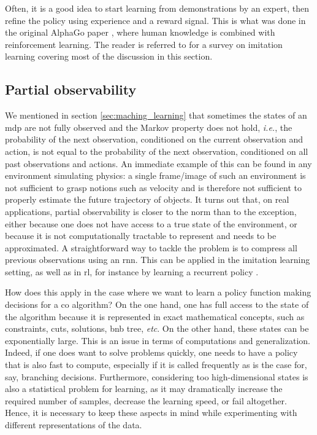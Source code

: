 \documentclass[11pt]{article}
\begin{document}
		Often, it is a good idea to start learning from demonstrations by an expert, then refine the policy
		using experience and a reward signal.
		This is what was done in the original AlphaGo paper \citep{SilverMasteringgameGo2016}, where human
		knowledge is combined with reinforcement learning.
		The reader is referred to \cite{HusseinImitationLearningSurvey2017} for a survey on imitation
		learning covering most of the discussion in this section.

	\subsection{Partial observability}
		\label{sec:partial_observability}
		We mentioned in section \ref{sec:maching_learning} that sometimes the states of an \gls{mdp} are
		not fully observed and the Markov property does not hold, \textit{i.e.}, the probability of the
		next observation, conditioned on the current observation and action, is not equal to the
		probability of the next observation, conditioned on all past observations and actions.
		An immediate example of this can be found in any environment simulating physics: a single
		frame/image of such an environment is not sufficient to grasp notions such as velocity and is
		therefore not sufficient to properly estimate the future trajectory of objects.
		It turns out that, on real applications, partial observability is closer to the norm than to the
		exception, either because one does not have access to a true state of the environment, or because
		it is not computationally tractable to represent and needs to be approximated.
		A straightforward way to tackle the problem is to compress all previous observations using an
		\gls{rnn}.
		This can be applied in the imitation learning setting, as well as in \gls{rl}, for instance by
		learning a recurrent policy \citep{WierstraRecurrentpolicy2010}.

		How does this apply in the case where we want to learn a policy function making decisions for a
		\gls{co} algorithm?
		On the one hand, one has full access to the state of the algorithm because it is represented in
		exact mathematical concepts, such as constraints, cuts, solutions, \gls{bnb} tree, \textit{etc}.
		On the other hand, these states can be exponentially large.
		This is an issue in terms of computations and generalization.
		Indeed, if one does want to solve problems quickly, one needs to have a policy that is also fast to
		compute, especially if it is called frequently as is the case for, say, branching decisions.
		Furthermore, considering too high-dimensional states is also a statistical problem for learning, as
		it may dramatically increase the required number of samples, decrease the learning speed, or
		fail altogether.
		Hence, it is necessary to keep these aspects in mind while experimenting with different
		representations of the data.
\end{document}
